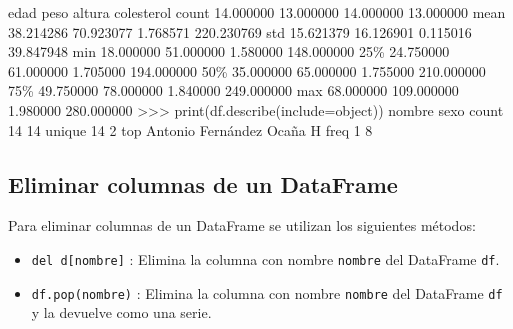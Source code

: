 \documentclass[
  spanish,
  a4paper,
]{scrreport}
\newenvironment{Shaded}{\begin{snugshade}}{\end{snugshade}}
\newcommand{\BuiltInTok}[1]{\textcolor[rgb]{0.00,0.23,0.31}{#1}}
\newcommand{\DecValTok}[1]{\textcolor[rgb]{0.68,0.00,0.00}{#1}}
\newcommand{\FloatTok}[1]{\textcolor[rgb]{0.68,0.00,0.00}{#1}}
\newcommand{\NormalTok}[1]{\textcolor[rgb]{0.00,0.23,0.31}{#1}}
\newcommand{\OperatorTok}[1]{\textcolor[rgb]{0.37,0.37,0.37}{#1}}
\newcommand{\StringTok}[1]{\textcolor[rgb]{0.13,0.47,0.30}{#1}}
\begin{document}
\begin{Shaded}
\begin{Highlighting}[]
\NormalTok{            edad        peso     altura  colesterol}
\NormalTok{count  }\FloatTok{14.000000}   \FloatTok{13.000000}  \FloatTok{14.000000}   \FloatTok{13.000000}
\NormalTok{mean   }\FloatTok{38.214286}   \FloatTok{70.923077}   \FloatTok{1.768571}  \FloatTok{220.230769}
\NormalTok{std    }\FloatTok{15.621379}   \FloatTok{16.126901}   \FloatTok{0.115016}   \FloatTok{39.847948}
\BuiltInTok{min}    \FloatTok{18.000000}   \FloatTok{51.000000}   \FloatTok{1.580000}  \FloatTok{148.000000}
\DecValTok{25}\OperatorTok{\%}    \FloatTok{24.750000}   \FloatTok{61.000000}   \FloatTok{1.705000}  \FloatTok{194.000000}
\DecValTok{50}\OperatorTok{\%}    \FloatTok{35.000000}   \FloatTok{65.000000}   \FloatTok{1.755000}  \FloatTok{210.000000}
\DecValTok{75}\OperatorTok{\%}    \FloatTok{49.750000}   \FloatTok{78.000000}   \FloatTok{1.840000}  \FloatTok{249.000000}
\BuiltInTok{max}    \FloatTok{68.000000}  \FloatTok{109.000000}   \FloatTok{1.980000}  \FloatTok{280.000000}
\OperatorTok{\textgreater{}\textgreater{}\textgreater{}} \BuiltInTok{print}\NormalTok{(df.describe(include}\OperatorTok{=}\StringTok{\textquotesingle{}object\textquotesingle{}}\NormalTok{))}
\NormalTok{                          nombre sexo}
\NormalTok{count                         }\DecValTok{14}   \DecValTok{14}
\NormalTok{unique                        }\DecValTok{14}    \DecValTok{2}
\NormalTok{top      Antonio Fernández Ocaña    H}
\NormalTok{freq                           }\DecValTok{1}    \DecValTok{8}
\end{Highlighting}
\end{Shaded}

\subsection{Eliminar columnas de un
DataFrame}\label{eliminar-columnas-de-un-dataframe}

Para eliminar columnas de un DataFrame se utilizan los siguientes
métodos:

\begin{itemize}
\item
  \texttt{del\ d{[}nombre{]}} : Elimina la columna con nombre
  \texttt{nombre} del DataFrame \texttt{df}.
\item
  \texttt{df.pop(nombre)} : Elimina la columna con nombre
  \texttt{nombre} del DataFrame \texttt{df} y la devuelve como una
  serie.
\end{itemize}
\end{document}

